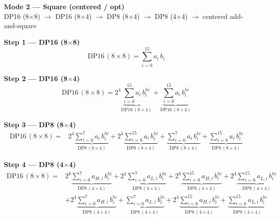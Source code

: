 \documentclass[fleqn]{article}
\newcommand{\DPop}[3]{\mathrm{DP#1}\,(#2\!\times\!#3)}
\begin{document}
\begin{center}
{\LARGE \textbf{Mode 2 --- Square (centered / opt)}}\\[4pt]
{\large DP16 (8$\times$8) $\rightarrow$ DP16 (8$\times$4) $\rightarrow$ DP8 (8$\times$4) $\rightarrow$ DP8 (4$\times$4) $\rightarrow$ centered add-and-square}
\end{center}

\textbf{Step 1 --- DP16 (8$\times$8)}
\[ \DPop{16}{8}{8} = \sum_{i=0}^{15} a_i \, b_i \]

\textbf{Step 2 --- DP16 (8$\times$4)}
\[ \DPop{16}{8}{8} = 2^{4}\underbrace{\sum_{i=0}^{15} a_i \, b_i^{hi}}_{\DPop{16}{8}{4}} + \underbrace{\sum_{i=0}^{15} a_i \, b_i^{lo}}_{\DPop{16}{8}{4}} \]

\textbf{Step 3 --- DP8 (8$\times$4)}
\begin{align*}
\DPop{16}{8}{8} = {}
  & 2^{4}\underbrace{\sum_{i=0}^{7} a_i \, b_i^{hi}}_{\DPop{8}{8}{4}}
  + 2^{4}\underbrace{\sum_{i=8}^{15} a_i \, b_i^{hi}}_{\DPop{8}{8}{4}}
  + \underbrace{\sum_{i=0}^{7} a_i \, b_i^{lo}}_{\DPop{8}{8}{4}}
  + \underbrace{\sum_{i=8}^{15} a_i \, b_i^{lo}}_{\DPop{8}{8}{4}}
\end{align*}

\textbf{Step 4 --- DP8 (4$\times$4)}
\begin{align*}
\DPop{16}{8}{8} = {}
  & 2^{8}\underbrace{\sum_{i=0}^{7} a_{H,i}\, b_i^{hi}}_{\DPop{8}{4}{4}}
  + 2^{4}\underbrace{\sum_{i=0}^{7} a_{L,i}\, b_i^{hi}}_{\DPop{8}{4}{4}}
  + 2^{8}\underbrace{\sum_{i=8}^{15} a_{H,i}\, b_i^{hi}}_{\DPop{8}{4}{4}}
  + 2^{4}\underbrace{\sum_{i=8}^{15} a_{L,i}\, b_i^{hi}}_{\DPop{8}{4}{4}} \\[0.5em]
  & + 2^{4}\underbrace{\sum_{i=0}^{7} a_{H,i}\, b_i^{lo}}_{\DPop{8}{4}{4}}
  + \underbrace{\sum_{i=0}^{7} a_{L,i}\, b_i^{lo}}_{\DPop{8}{4}{4}}
  + 2^{4}\underbrace{\sum_{i=8}^{15} a_{H,i}\, b_i^{lo}}_{\DPop{8}{4}{4}}
  + \underbrace{\sum_{i=8}^{15} a_{L,i}\, b_i^{lo}}_{\DPop{8}{4}{4}}
\end{align*}
\end{document}
